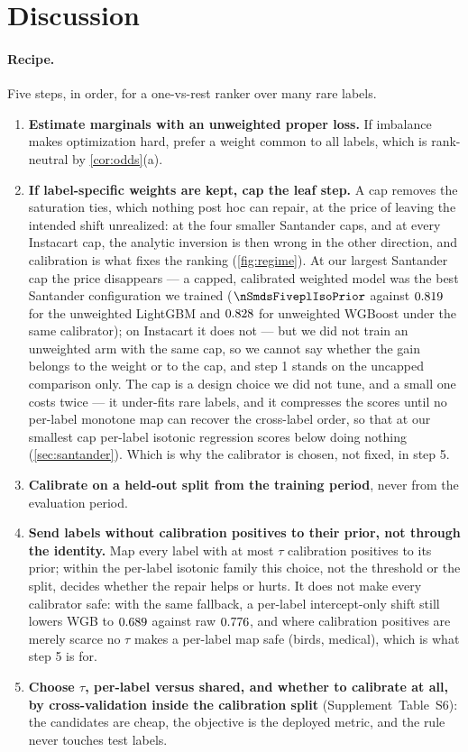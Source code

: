 \documentclass[sigconf,nonacm]{acmart}
\newcommand{\Wm}{\textsf{WGB}\xspace}
\newcommand{\Supp}[1]{Supplement~#1}  %
\begin{document}
\section{Discussion}
\label{sec:discussion}

\paragraph{Recipe.} Five steps, in order, for a one-vs-rest ranker over many rare labels.

\begin{enumerate}[leftmargin=*,nosep]
\item \textbf{Estimate marginals with an unweighted proper loss.} If imbalance makes optimization hard, prefer a weight common to all labels, which is rank-neutral by \cref{cor:odds}(a).
\item \textbf{If label-specific weights are kept, cap the leaf step.} A cap removes the saturation ties, which nothing post hoc can repair, at the price of leaving the intended shift unrealized: at the four smaller Santander caps, and at every Instacart cap, the analytic inversion is then wrong in the other direction, and calibration is what fixes the ranking (\cref{fig:regime}). At our largest Santander cap the price disappears --- a capped, calibrated weighted model was the best Santander configuration we trained ($\nSmdsFiveplIsoPrior$ against $0.819$ for the unweighted LightGBM and $0.828$ for unweighted WGBoost under the same calibrator); on Instacart it does not --- but we did not train an unweighted arm with the same cap, so we cannot say whether the gain belongs to the weight or to the cap, and step 1 stands on the uncapped comparison only. The cap is a design choice we did not tune, and a small one costs twice --- it under-fits rare labels, and it compresses the scores until no per-label monotone map can recover the cross-label order, so that at our smallest cap per-label isotonic regression scores below doing nothing (\cref{sec:santander}). Which is why the calibrator is chosen, not fixed, in step 5.
\item \textbf{Calibrate on a held-out split from the training period}, never from the evaluation period.
\item \textbf{Send labels without calibration positives to their prior, not through the identity.} Map every label with at most $\tau$ calibration positives to its prior; within the per-label isotonic family this choice, not the threshold or the split, decides whether the repair helps or hurts. It does not make every calibrator safe: with the same fallback, a per-label intercept-only shift still lowers \Wm{} to $0.689$ against raw $0.776$, and where calibration positives are merely scarce no $\tau$ makes a per-label map safe (birds, medical), which is what step 5 is for.
\item \textbf{Choose $\tau$, per-label versus shared, and whether to calibrate at all, by cross-validation inside the calibration split} (\Supp{Table~S6}): the candidates are cheap, the objective is the deployed metric, and the rule never touches test labels.
\end{enumerate}
\end{document}
